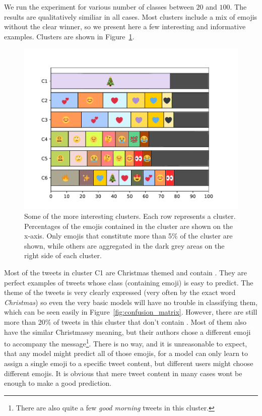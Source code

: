 \documentclass[10pt, a4paper]{article}
\begin{document}
We run the experiment for various number of classes between $20$ and $100$.
The results are qualitatively similiar in all cases. Most clusters include a 
mix of emojis without the clear winner, so we present here a few interesting and
informative examples. Clusters are shown in Figure~\ref{fig:clusters}.

\begin{figure}
\begin{center}
\includegraphics[width=\columnwidth]{img/clusters.pdf}
\caption{Some of the more interesting clusters. Each row represents a cluster. 
Percentages of the emojis contained in the cluster are shown on the x-axis. Only
emojis that constitute more than 5\% of the cluster are shown, while others are 
aggregated in the dark grey areas on the right side of each cluster.}
\label{fig:clusters}
\end{center}
\end{figure}

Most of the tweets in cluster C1 are Christmas themed and contain .
They are perfect examples of tweets whose class (containing emoji) is easy to 
predict. The theme of the tweets is very clearly expressed (very often by the 
exact word \emph{Christmas}) so even the very basic models will have no trouble 
in classifying them, which can be seen easily in 
Figure~\ref{fig:confusion_matrix}. However, there are still more than 20\% of 
tweets in this cluster that don't contain . Most of them also have 
the similar Christmassy meaning, but their authors chose a different emoji to 
accompany the message\footnote{There are also quite a few \emph{good morning} 
tweets in this cluster.}. There is no way, and it is unreasonable to expect, 
that any model might predict all of those emojis, for a model can only learn to 
assign a single emoji to a specific tweet content, but different users might 
choose different emojis. It is obvious that mere tweet content in many cases 
wont be enough to make a good prediction.
\end{document}
